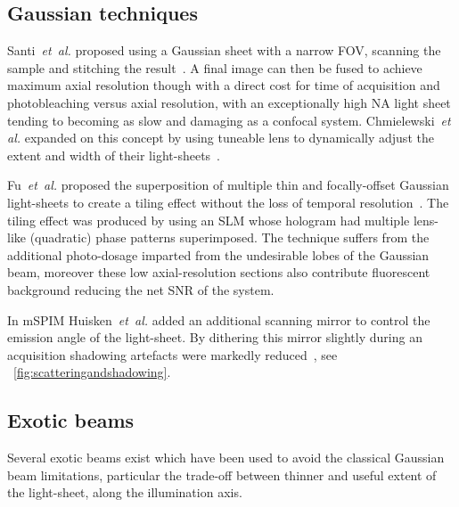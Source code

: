 \subsection{Gaussian techniques}

Santi~\emph{et~al.} proposed using a Gaussian sheet with a narrow \gls{FOV}, scanning the sample and stitching the result~\cite{santiThinsheetLaserImaging2009}.
A final image can then be fused to achieve maximum axial resolution though with a direct cost for time of acquisition and photobleaching versus axial resolution, with an exceptionally high \gls{NA} light sheet tending to becoming as slow and damaging as a confocal system.
Chmielewski~\emph{et al.} expanded on this concept by using tuneable lens to dynamically adjust the extent and width of their \gls{light-sheet}s~\cite{chmielewskiFastImagingLive2015}.

Fu~\emph{et~al.} proposed the superposition of multiple thin and focally-offset Gaussian \gls{light-sheet}s to create a tiling effect without the loss of temporal resolution~\cite{fu_imaging_2016}.
The tiling effect was produced by using an \gls{SLM} whose hologram had multiple lens-like (quadratic) phase patterns superimposed.
The technique suffers from the additional photo-dosage imparted from the undesirable lobes of the Gaussian beam, moreover these low axial-resolution sections also contribute fluorescent background reducing the net \gls{SNR} of the system.

In \gls{mSPIM} Huisken~\emph{et~al.} added an additional scanning mirror to control the emission angle of the \gls{light-sheet}.
By dithering this mirror slightly during an acquisition shadowing artefacts were markedly reduced~\cite{huiskenEvenFluorescenceExcitation2007}, see \figurename~\ref{fig:scatteringandshadowing}.

\subsection{Exotic beams}

Several \gls{exotic beam}s exist which have been used to avoid the
classical \gls{Gaussian beam} limitations, particular the trade-off between thinner and useful extent of the light-sheet, along the illumination axis.

